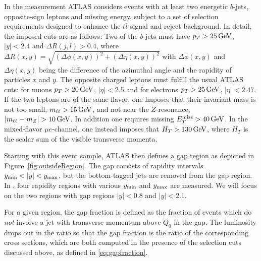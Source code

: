 \documentclass[11pt,a4paper]{article}
\begin{document}
In the measurement ATLAS considers events with at least two energetic $b$-jets, opposite-sign leptons and missing energy, subject to a set of selection requirements designed to enhance the $t\bar{t}$ signal and reject background. In detail, the imposed cuts are as follows: Two of the $b$-jets must have $p_T>25\, {\rm GeV}$, $|y|<2.4$ and $\Delta R(j, l) > 0.4$, where $\Delta R (x,y)=\sqrt{(\Delta \phi(x,y))^2+(\Delta \eta(x,y))^2}$ with  $\Delta \phi (x,y)$ and $\Delta \eta (x,y)$ being the difference of the azimuthal angle and the rapidity of particles $x$ and $y$. 
The opposite charged leptons must fulfill the usual ATLAS cuts: for muons $p_T>20\,{\rm GeV}$, $|\eta|< 2.5$ and for electrons $p_T>25\,{\rm GeV}$, $|\eta|< 2.47$. If the two leptons are of the same flavor, one imposes that their invariant mass is not too small, $m_{\ell\ell} >15\,{\rm GeV}$, and not near the $Z$-resonance, $|m_{\ell\ell}-m_Z| >10\,{\rm GeV}$. In addition one requires missing $E_T^{\rm miss} > 40\,{\rm GeV}$. In the mixed-flavor $\mu e$-channel, one instead imposes that $H_T> 130\,{\rm GeV} $, where $H_T$ is the scalar sum of the visible transverse momenta.

Starting with this event sample, ATLAS then defines a gap region as depicted in Figure~\ref{fig:outsideRegion}. The gap consists of rapidity intervals $y_{\rm min} <|y|<y_{\rm max} $, but the bottom-tagged jets are removed from the gap region. In \cite{ATLAS:2012al}, four rapidity regions with various $y_{\rm min}$ and $y_{\rm max}$ are measured. We will focus on the two regions with gap regions $|y|<0.8$ and $|y|<2.1$.
	
For a given region, the gap fraction is defined as the fraction of events which do {\em not} involve a jet with transverse momentum above $Q_0$ in the gap. The luminosity drops out in the ratio so that the gap fraction is the ratio of the corresponding cross sections, which are both computed in the presence of the selection cuts discussed above, as defined in \eqref{eq:gapfraction}.
\end{document}

